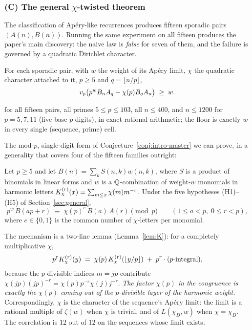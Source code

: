 \subsubsection*{(C) The general $\chi$-twisted theorem}
The classification of Ap\'ery-like recurrences produces fifteen sporadic pairs
$(A(n),B(n))$. Running the same experiment on all fifteen produces the paper's main
discovery: the naive law is \emph{false} for seven of them, and the failure is governed by
a quadratic Dirichlet character.

\begin{conjecture}
\label{conj:intro-master}
For each sporadic pair, with $w$ the weight of its Ap\'ery limit, $\chi$ the quadratic
character attached to it, $p\ge 5$ and $q=\lfloor n/p\rfloor$,
\[
  v_p\bigl(p^{w}B_nA_q-\chi(p)B_qA_n\bigr)\;\ge\;w .
\]
\end{conjecture}

\noindent
{} for all fifteen pairs, all primes $5\le p\le 103$, all $n\le400$,
and $n\le 1200$ for $p=5,7,11$ (five base-$p$ digits), in exact rational arithmetic; the
floor is exactly $w$ in every single (sequence, prime) cell.

The mod-$p$, single-digit form of Conjecture~\ref{conj:intro-master} we can prove, in a
generality that covers four of the fifteen families outright:

\begin{theorem}
\label{thm:intro-LB}
Let $p\ge5$ and let $B(n)=\sum_kS(n,k)w(n,k)$, where $S$ is a product of binomials in
linear forms and $w$ is a $\mathbb{Q}$-combination of weight-$w$ monomials in harmonic letters
$K^{(r)}_{\chi}(x)=\sum_{m\le x}\chi(m)m^{-r}$. Under the five hypotheses
\textup{(H1)--(H5)} of Section~\ref{sec:general},
\[
  p^{w}\,B(ap+r)\;\equiv\;\chi(p)^{e}\,B(a)\,A(r)\pmod p
  \qquad(1\le a<p,\;0\le r<p),
\]
where $e\in\{0,1\}$ is the common number of $\chi$-letters per monomial.
\end{theorem}

The mechanism is a two-line lemma (Lemma~\ref{lem:K}): for a completely multiplicative
$\chi$,
\[
   p^rK^{(r)}_{\chi}(y) \;=\; \chi(p)\,K^{(r)}_{\chi}(\lfloor y/p\rfloor)\;+\;p^r\cdot(\text{$p$-integral}),
\]
because the $p$-divisible indices $m=jp$ contribute $\chi(jp)(jp)^{-r}
=\chi(p)p^{-r}\chi(j)j^{-r}$. \emph{The factor $\chi(p)$ in the congruence is exactly the
$\chi(p)$ coming out of the $p$-divisible layer of the harmonic weight.} Correspondingly,
$\chi$ is the character of the sequence's Ap\'ery limit: the limit is a rational multiple
of $\zeta(w)$ when $\chi$ is trivial, and of $L(\chi_D,w)$ when $\chi=\chi_D$. The
correlation is $12$ out of $12$ on the sequences whose limit exists.


